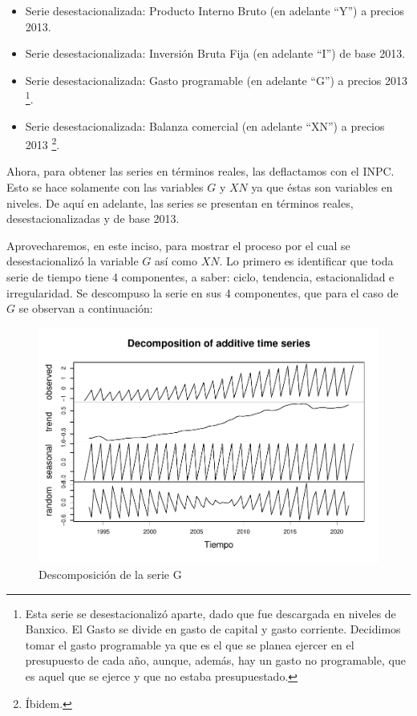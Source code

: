 \documentclass[
]{article}
\providecommand{\tightlist}{%
  \setlength{\itemsep}{0pt}\setlength{\parskip}{0pt}}
\begin{document}
\begin{itemize}
\tightlist
\item
  Serie desestacionalizada: Producto Interno Bruto (en adelante ``Y'') a
  precios 2013.
\item
  Serie desestacionalizada: Inversión Bruta Fija (en adelante ``I'') de
  base 2013.
\item
  Serie desestacionalizada: Gasto programable (en adelante ``G'') a
  precios 2013 \footnote{Esta serie se desestacionalizó aparte, dado que
    fue descargada en niveles de Banxico. El Gasto se divide en gasto de
    capital y gasto corriente. Decidimos tomar el gasto programable ya
    que es el que se planea ejercer en el presupuesto de cada año,
    aunque, además, hay un gasto no programable, que es aquel que se
    ejerce y que no estaba presupuestado.}.
\item
  Serie desestacionalizada: Balanza comercial (en adelante ``XN'') a
  precios 2013 \footnote{Íbidem.}.
\end{itemize}

Ahora, para obtener las series en términos reales, las deflactamos con
el INPC. Esto se hace solamente con las variables \(G\) y \(XN\) ya que
éstas son variables en niveles. De aquí en adelante, las series se
presentan en términos reales, desestacionalizadas y de base 2013.

Aprovecharemos, en este inciso, para mostrar el proceso por el cual se
desestacionalizó la variable \(G\) así como \(XN\). Lo primero es
identificar que toda serie de tiempo tiene 4 componentes, a saber:
ciclo, tendencia, estacionalidad e irregularidad. Se descompuso la serie
en sus 4 componentes, que para el caso de \(G\) se observan a
continuación:

\begin{figure}
\centering
\includegraphics{Ejercicio-3_files/figure-latex/unnamed-chunk-2-1.pdf}
\caption{Descomposición de la serie G}
\end{figure}
\end{document}
